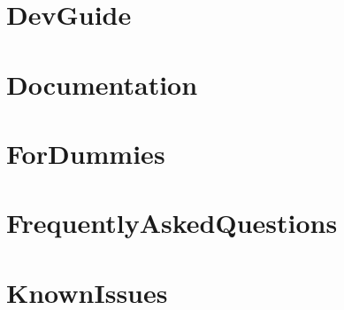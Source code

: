 \documentclass[twoside]{book}
\newcommand{\+}{\discretionary{\mbox{\scriptsize$\hookleftarrow$}}{}{}}
\begin{document}
\chapter{Dev\+Guide}
\label{md_smacc_sm_reference_library_sm_panda_moveit_libfranka_3rdparty_googletest_googlemock_docs_DevGuide}

\chapter{Documentation}
\label{md_smacc_sm_reference_library_sm_panda_moveit_libfranka_3rdparty_googletest_googlemock_docs_Documentation}

\chapter{For\+Dummies}
\label{md_smacc_sm_reference_library_sm_panda_moveit_libfranka_3rdparty_googletest_googlemock_docs_ForDummies}

\chapter{Frequently\+Asked\+Questions}
\label{md_smacc_sm_reference_library_sm_panda_moveit_libfranka_3rdparty_googletest_googlemock_docs_FrequentlyAskedQuestions}

\chapter{Known\+Issues}
\label{md_smacc_sm_reference_library_sm_panda_moveit_libfranka_3rdparty_googletest_googlemock_docs_KnownIssues}

\end{document}
